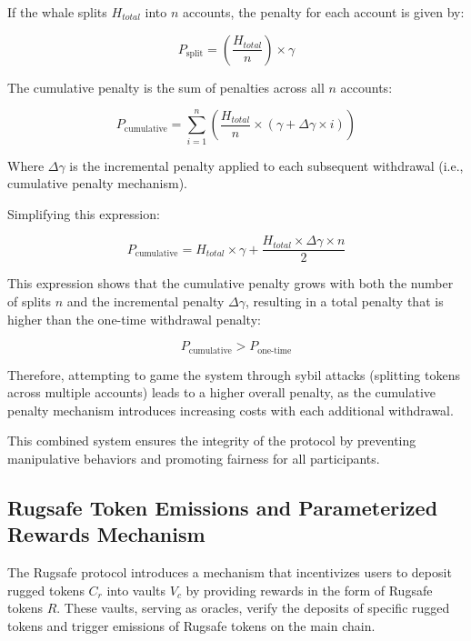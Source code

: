 \documentclass{article}
\begin{document}
If the whale splits $H_{total}$ into $n$ accounts, the penalty for each account is given by:

\[
P_{\text{split}} = \left(\frac{H_{total}}{n}\right) \times \gamma
\]

The cumulative penalty is the sum of penalties across all $n$ accounts:

\[
P_{\text{cumulative}} = \sum_{i=1}^{n} \left( \frac{H_{total}}{n} \times \left( \gamma + \Delta \gamma \times i \right) \right)
\]

Where $\Delta \gamma$ is the incremental penalty applied to each subsequent withdrawal (i.e., cumulative penalty mechanism).

Simplifying this expression:

\[
P_{\text{cumulative}} = H_{total} \times \gamma + \frac{H_{total} \times \Delta \gamma \times n}{2}
\]

This expression shows that the cumulative penalty grows with both the number of splits $n$ and the incremental penalty $\Delta \gamma$, resulting in a total penalty that is higher than the one-time withdrawal penalty:

\[
P_{\text{cumulative}} > P_{\text{one-time}}
\]

Therefore, attempting to game the system through sybil attacks (splitting tokens across multiple accounts) leads to a higher overall penalty, as the cumulative penalty mechanism introduces increasing costs with each additional withdrawal.

This combined system ensures the integrity of the protocol by preventing manipulative behaviors and promoting fairness for all participants.












\subsection{Rugsafe Token Emissions and Parameterized Rewards Mechanism}

The Rugsafe protocol introduces a mechanism that incentivizes users to deposit rugged tokens $C_r$ into vaults $V_c$ by providing rewards in the form of Rugsafe tokens $R$. These vaults, serving as oracles, verify the deposits of specific rugged tokens and trigger emissions of Rugsafe tokens on the main chain.
\end{document}
